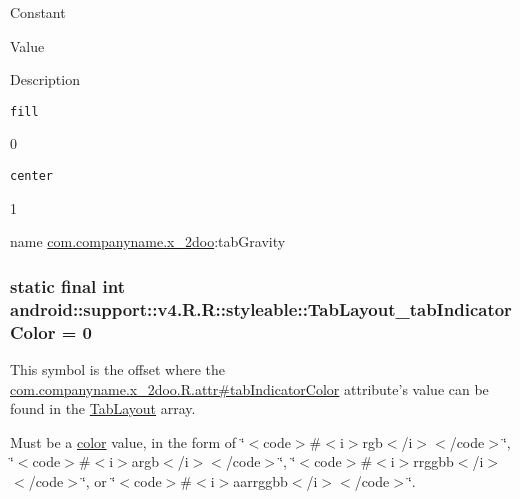 Constant

Value

Description 

{\tt fill}

0

{\tt center}

1

name \hyperlink{namespacecom_1_1companyname_1_1x__2doo}{com.companyname.x\_\-2doo}:tabGravity \hypertarget{classandroid_1_1support_1_1v4_1_1_r_1_1styleable_ecd068c380384ff47f22004dc6bf860e}{
\subsubsection[{TabLayout\_\-tabIndicatorColor}]{\setlength{\rightskip}{0pt plus 5cm}static final int android::support::v4.R.R::styleable::TabLayout\_\-tabIndicatorColor = 0}}
\label{classandroid_1_1support_1_1v4_1_1_r_1_1styleable_ecd068c380384ff47f22004dc6bf860e}


This symbol is the offset where the \hyperlink{classcom_1_1companyname_1_1x__2doo_1_1_r_1_1attr_726a6d346a595d9583fbbdac9cee3ddc}{com.companyname.x\_\-2doo.R.attr\#tabIndicatorColor} attribute's value can be found in the \hyperlink{classandroid_1_1support_1_1v4_1_1_r_1_1styleable_d1f1104cdc4fac0ab4797d48f7efe351}{TabLayout} array.

Must be a \hyperlink{classandroid_1_1support_1_1v4_1_1_r_1_1color}{color} value, in the form of \char`\"{}$<$code$>$\#$<$i$>$rgb$<$/i$>$$<$/code$>$\char`\"{}, \char`\"{}$<$code$>$\#$<$i$>$argb$<$/i$>$$<$/code$>$\char`\"{}, \char`\"{}$<$code$>$\#$<$i$>$rrggbb$<$/i$>$$<$/code$>$\char`\"{}, or \char`\"{}$<$code$>$\#$<$i$>$aarrggbb$<$/i$>$$<$/code$>$\char`\"{}. 

